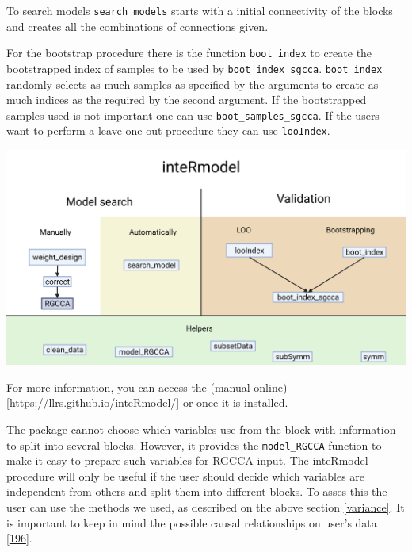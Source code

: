 \documentclass[
  a4paper,
]{book}
\let\origfigure\figure
\let\endorigfigure\endfigure
\renewenvironment{figure}[1][2] {
    \expandafter\origfigure\expandafter[!ht]
} {
    \endorigfigure
}
\begin{document}
To search models \texttt{search\_models} starts with a initial connectivity of the blocks and creates all the combinations of connections given.

For the bootstrap procedure there is the function \texttt{boot\_index} to create the bootstrapped index of samples to be used by \texttt{boot\_index\_sgcca}.
\texttt{boot\_index} randomly selects as much samples as specified by the arguments to create as much indices as the required by the second argument.
If the bootstrapped samples used is not important one can use \texttt{boot\_samples\_sgcca}.
If the users want to perform a leave-one-out procedure they can use \texttt{looIndex}.

\begin{figure}
\includegraphics[width=1\linewidth]{images/inteRmodel-workflows} \caption[inteRmodel functions and workflow.]{Functions provided by the inteRmodel package to search and validate models of relationships using RGCCA. Created with BioRender.com}\label{fig:intermodel-workflows}
\end{figure}

For more information, you can access the (manual online){[}\url{https://llrs.github.io/inteRmodel/}{]} or once it is installed.

The package cannot choose which variables use from the block with information to split into several blocks.
However, it provides the \texttt{model\_RGCCA} function to make it easy to prepare such variables for RGCCA input.
The inteRmodel procedure will only be useful if the user should decide which variables are independent from others and split them into different blocks.
To asses this the user can use the methods we used, as described on the above section \ref{variance}.
It is important to keep in mind the possible causal relationships on user's data {[}\protect\hyperlink{ref-greenland2002}{196}{]}.
\end{document}
